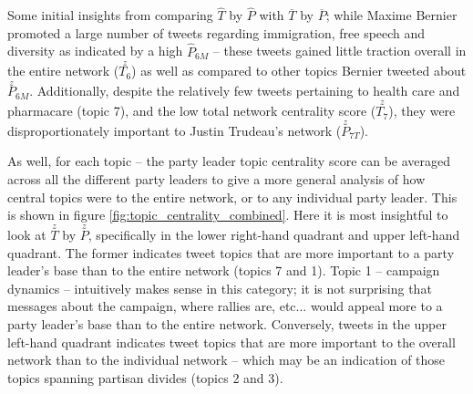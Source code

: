 Some initial insights from comparing \textbf{$\hat{T}$} by \textbf{$\hat{P}$}
with \textbf{$\overline{T}$} by \textbf{$\overline{P}$}; while Maxime Bernier
promoted a large number of tweets regarding immigration, free speech and
diversity as indicated by a high $\hat{P}_{6M}$ -- these tweets gained little
traction overall in the entire network ($\stackrel{z}{T_{6}}$) as well as compared to
other topics Bernier tweeted about $\stackrel{z}{P}_{6M}$. Additionally, despite
the relatively few tweets pertaining to health care and pharmacare (topic 7),
and the low total network centrality score ($\stackrel{z}{T_{7}}$), they were
disproportionately important to Justin Trudeau's network
($\stackrel{z}{P}_{7T}$).

As well, for each topic -- the party leader topic centrality score can be
averaged across all the different party leaders to give a more general analysis
of how central topics were to the entire network, or to any individual party
leader. This is shown in figure \ref{fig:topic_centrality_combined}. Here it is
most insightful to look at \textbf{$\stackrel{z}{T}$} by
\textbf{$\stackrel{z}{P}$}, specifically in the lower right-hand quadrant and
upper left-hand quadrant. The former indicates tweet topics that are more
important to a party leader's base than to the entire network (topics 7 and 1).
Topic 1 -- campaign dynamics -- intuitively makes sense in this category; it is
not surprising that messages about the campaign, where rallies are, etc... would
appeal more to a party leader's base than to the entire network. Conversely,
tweets in the upper left-hand quadrant indicates tweet topics that are more
important to the overall network than to the individual network -- which may be
an indication of those topics spanning partisan divides (topics 2 and 3).

